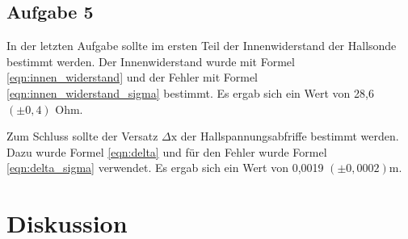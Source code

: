 \documentclass[12pt]{scrartcl}
\begin{document}
\subsection{Aufgabe 5}
In der letzten Aufgabe sollte im ersten Teil der Innenwiderstand der Hallsonde bestimmt werden. Der Innenwiderstand wurde mit Formel \ref{eqn:innen_widerstand} und der Fehler mit Formel \ref{eqn:innen_widerstand_sigma} bestimmt. Es ergab sich ein Wert von 28,6 $(\pm 0,4)$ Ohm.

Zum Schluss sollte der Versatz $\Delta\text{x}$ der Hallspannungsabfriffe bestimmt werden. Dazu wurde Formel \ref{eqn:delta} und für den Fehler wurde Formel \ref{eqn:delta_sigma} verwendet. Es ergab sich ein Wert von 0,0019 $(\pm 0,0002)$m.

\newpage
\section{Diskussion}
\end{document}
